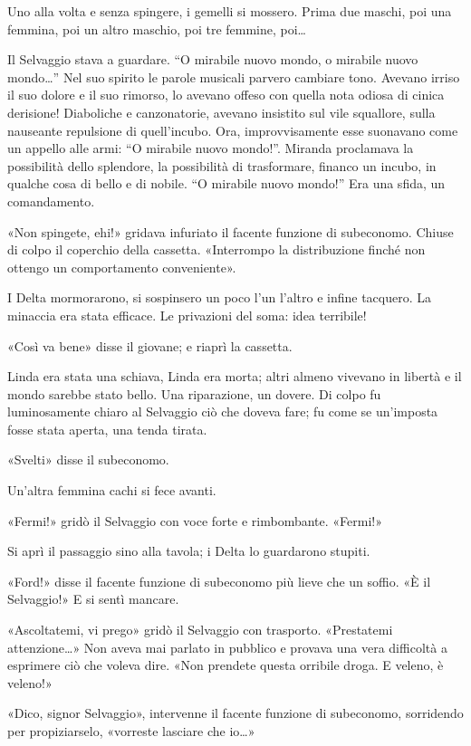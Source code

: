 \documentclass[
a5paper, %
10pt, %
twoside, 
onecolumn, %
openany, %
]{memoir}
\begin{document}
Uno alla volta e senza spingere, i gemelli si mossero. Prima due maschi, poi una femmina, poi un altro maschio, poi tre femmine, poi…

Il Selvaggio stava a guardare. “O mirabile nuovo mondo, o mirabile nuovo mondo…” Nel suo spirito le parole musicali parvero cambiare tono. Avevano irriso il suo dolore e il suo rimorso, lo avevano offeso con quella nota odiosa di cinica derisione! Diaboliche e canzonatorie, avevano insistito sul vile squallore, sulla nauseante repulsione di quell’incubo. Ora, improvvisamente esse suonavano come un appello alle armi: “O mirabile nuovo mondo!”. Miranda proclamava la possibilità dello splendore, la possibilità di trasformare, financo un incubo, in qualche cosa di bello e di nobile. “O mirabile nuovo mondo!” Era una sfida, un comandamento.

«Non spingete, ehi!» gridava infuriato il facente funzione di subeconomo. Chiuse di colpo il coperchio della cassetta. «Interrompo la distribuzione finché non ottengo un comportamento conveniente».

I Delta mormorarono, si sospinsero un poco l’un l’altro e infine tacquero. La minaccia era stata efficace. Le privazioni del soma: idea terribile!

«Così va bene» disse il giovane; e riaprì la cassetta.

Linda era stata una schiava, Linda era morta; altri almeno vivevano in libertà e il mondo sarebbe stato bello. Una riparazione, un dovere. Di colpo fu luminosamente chiaro al Selvaggio ciò che doveva fare; fu come se un’imposta fosse stata aperta, una tenda tirata.

«Svelti» disse il subeconomo.

Un’altra femmina cachi si fece avanti.

«Fermi!» gridò il Selvaggio con voce forte e rimbombante. «Fermi!»

Si aprì il passaggio sino alla tavola; i Delta lo guardarono stupiti.

«Ford!» disse il facente funzione di subeconomo più lieve che un soffio. «È il Selvaggio!» E si sentì mancare.

«Ascoltatemi, vi prego» gridò il Selvaggio con trasporto. «Prestatemi attenzione…» Non aveva mai parlato in pubblico e provava una vera difficoltà a esprimere ciò che voleva dire. «Non prendete questa orribile droga. E veleno, è veleno!»

«Dico, signor Selvaggio», intervenne il facente funzione di subeconomo, sorridendo per propiziarselo, «vorreste lasciare che io…»
\end{document}
